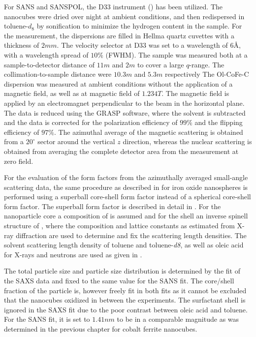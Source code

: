 \documentclass[\main/dresen_thesis.tex]{subfiles}
\begin{document}
    For SANS and SANSPOL, the D33 instrument () has been utilized.
    The nanocubes were dried over night at ambient conditions, and then redispersed in toluene-$\mathit{d_8}$ by sonification to minimize the hydrogen content in the sample.
    For the measurement, the dispersions are filled in Hellma quartz cuvettes with a thickness of $2 \unit{mm}$.
    The velocity selector at D33 was set to a wavelength of $6 \unit{\angstrom}$, with a wavelength spread of $10 \%$ (FWHM).
    The sample was measured both at a sample-to-detector distance of $11 \unit{m}$ and $2 \unit{m}$ to cover a large $q$-range.
    The collimation-to-sample distance were $10.3 \unit{m}$ and $5.3 \unit{m}$ respectively
    The Ol-CoFe-C dispersion was measured at ambient conditions without the application of a magnetic field, as well as at magnetic field of $1.234 \unit{T}$. %
    The magnetic field is applied by an electromagnet perpendicular to the beam in the horizontal plane.
    The data is reduced using the GRASP software, where the solvent is subtracted and the data is corrected for the polarization efficiency of $99 \%$ and the flipping efficiency of $97 \%$.
    The azimuthal average of the magnetic scattering is obtained from a $20 ^\circ$ sector around the vertical $z$ direction, whereas the nuclear scattering is obtained from averaging the complete detector area from the measurement at zero field.

    For the evaluation of the form factors from the azimuthally averaged small-angle scattering data, the same procedure as described in  for iron oxide nanospheres is performed using a superball core-shell form factor instead of a spherical core-shell form factor.
    The superball form factor is described in detail in .
    For the nanoparticle core a composition of  is assumed and for the shell an inverse spinell structure of , where the composition and lattice constants as estimated from X-ray diffraction are used to determine and fix the scattering length densities.
    The solvent scattering length density of toluene and toluene-\textit{d8}, as well as oleic acid for X-rays and neutrons are used as given in .

    The total particle size and particle size distribution is determined by the fit of the SAXS data and fixed to the same value for the SANS fit.
    The core/shell fraction of the particle is, however freely fit in both fits as it cannot be excluded that the nanocubes oxidized in between the experiments.
    The surfactant shell is ignored in the SAXS fit due to the poor contrast between oleic acid and toluene.
    For the SANS fit, it is set to $1.41 \unit{nm}$ to be in a comparable magnitude as was determined in the previous chapter  for cobalt ferrite nanocubes.
\end{document}
